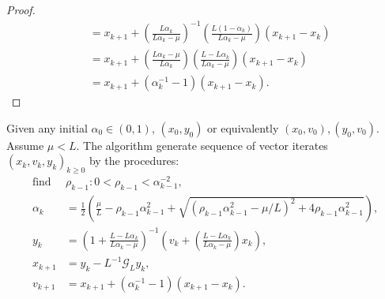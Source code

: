 \documentclass[12pt]{article}
\begin{document}
\begin{proof}
\begin{align*}
                &= 
                x_{k + 1} + \left(
                    \frac{L\alpha_k}{L\alpha_k - \mu}
                \right)^{-1}\left(
                    \frac{L(1 - \alpha_k)}{L\alpha_k - \mu}
                \right)(x_{k + 1} - x_k)
                \\
                &= 
                x_{k + 1} + \left(
                    \frac{L\alpha_k - \mu}{L\alpha_k}
                \right)\left(
                    \frac{L - L\alpha_k}{L\alpha_k - \mu}
                \right)(x_{k + 1} - x_k)
                \\
                &= x_{k + 1} + (\alpha_k^{-1} - 1)(x_{k + 1} - x_k). 
            \end{align*}
        \end{proof}
    \begin{definition}\label{def:r-wapg-st-form}
        Given any initial $\alpha_0 \in (0, 1)$, $(x_0, y_0)$ or equivalently $(x_0, v_0), (y_0, v_0)$. 
        Assume $\mu < L$. 
        The algorithm generate sequence of vector iterates $(x_k, v_k, y_k)_{k \ge0}$ by the procedures: 
        \begin{align*}
            \text{find }& \rho_{k - 1}: 0 < \rho_{k - 1} < \alpha_{k - 1}^{-2},
            \\
            \alpha_k &= 
            \frac{1}{2}\left(
            \frac{\mu}{L} - \rho_{k - 1}\alpha_{k - 1}^2 
            +
            \sqrt{(\rho_{k - 1}\alpha_{k - 1}^2 - \mu/L)^2 + 4\rho_{k - 1}\alpha_{k - 1}^2}
            \right), 
            \\
            y_k &= 
            \left(
                1 + \frac{L - L\alpha_k}{L\alpha_k - \mu}
            \right)^{-1}
            \left(
                v_k + 
                \left(\frac{L - L\alpha_k}{L\alpha_k - \mu} \right) x_k
            \right), 
            \\
            x_{k + 1} &= 
            y_k - L^{-1} \mathcal G_L y_k, 
            \\
            v_{k + 1} &= 
            x_{k + 1} + (\alpha_k^{-1} -1)(x_{k + 1} - x_k). 
        \end{align*}
    \end{definition}
    
\end{document}
